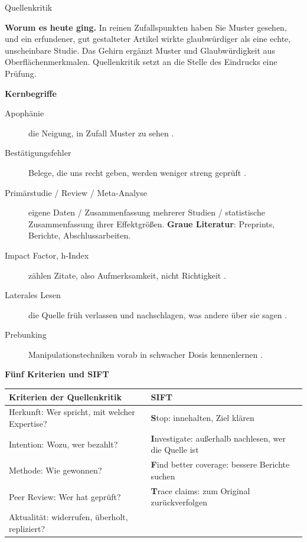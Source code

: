 \begin{handout}{Quellenkritik}

\textbf{Worum es heute ging.} In reinen Zufallspunkten haben Sie Muster
gesehen, und ein erfundener, gut gestalteter Artikel wirkte
glaubwürdiger als eine echte, unscheinbare Studie. Das Gehirn ergänzt
Muster und Glaubwürdigkeit aus Oberflächenmerkmalen. Quellenkritik
setzt an die Stelle des Eindrucks eine Prüfung.

\textbf{Kernbegriffe}
\begin{description}
  \item[Apophänie] die Neigung, in Zufall Muster zu sehen
    \parencite{conrad1958schizophrenie}.
  \item[Bestätigungsfehler] Belege, die uns recht geben, werden weniger
    streng geprüft \parencite{nickerson1998ubiquitous}.
  \item[Primärstudie / Review / Meta-Analyse] eigene Daten /
    Zusammenfassung mehrerer Studien / statistische Zusammenfassung ihrer
    Effektgrößen. \textbf{Graue Literatur}: Preprints, Berichte,
    Abschlussarbeiten.
  \item[Impact Factor, h-Index] zählen Zitate, also Aufmerksamkeit, nicht
    Richtigkeit \parencite{seglen1997impact,hirsch2005index}.
  \item[Laterales Lesen] die Quelle früh verlassen und nachschlagen, was
    andere über sie sagen \parencite{wineburg2019lateral}.
  \item[Prebunking] Manipulationstechniken vorab in schwacher Dosis
    kennenlernen \parencite{roozenbeek2022inoculation}.
\end{description}

\textbf{Fünf Kriterien und SIFT}

\begin{center}
\small
\begin{tabular}{@{}p{}p{}@{}}
\toprule
\textbf{Kriterien der Quellenkritik} & \textbf{SIFT} \parencite{caulfield2023verified} \\
\midrule
Herkunft: Wer spricht, mit welcher Expertise? & \textbf{S}top: innehalten, Ziel klären \\
Intention: Wozu, wer bezahlt? & \textbf{I}nvestigate: außerhalb nachlesen, wer die Quelle ist \\
Methode: Wie gewonnen? & \textbf{F}ind better coverage: bessere Berichte suchen \\
Peer Review: Wer hat geprüft? & \textbf{T}race claims: zum Original zurückverfolgen \\
Aktualität: widerrufen, überholt, repliziert? & \\
\bottomrule
\end{tabular}
\end{center}


\end{handout}
